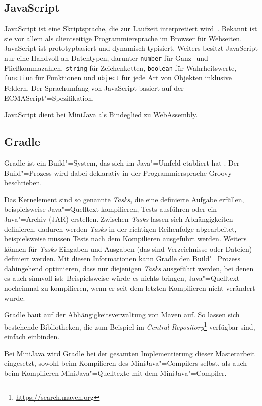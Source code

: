 \subsection{JavaScript}
JavaScript ist eine Skriptsprache, die zur Laufzeit interpretiert wird \cite{MDNJavaScript}. Bekannt ist sie vor allem als clientseitige Programmiersprache im Browser für Webseiten. JavaScript ist prototypbasiert und dynamisch typisiert. Weiters besitzt JavaScript nur eine Handvoll an Datentypen, darunter \lstinline{number} für Ganz- und Fließkommazahlen, \lstinline{string} für Zeichenketten, \lstinline{boolean} für Wahrheitswerte, \lstinline{function} für Funktionen und \lstinline{object} für jede Art von Objekten inklusive Feldern. Der Sprachumfang von JavaScript basiert auf der ECMAScript"=Spezifikation.

JavaScript dient bei MiniJava als Bindeglied zu WebAssembly.

\subsection{Gradle}
Gradle ist ein Build"=System, das sich im Java"=Umfeld etabliert hat \cite{Gradle}. Der Build"=Prozess wird dabei deklarativ in der Programmiersprache Groovy beschrieben.

Das Kernelement sind so genannte \emph{Tasks}, die eine definierte Aufgabe erfüllen, beispielsweise Java"=Quelltext kompilieren, Tests ausführen oder ein Java"=Archiv (JAR) erstellen. Zwischen \emph{Tasks} lassen sich Abhängigkeiten definieren, dadurch werden \emph{Tasks} in der richtigen Reihenfolge abgearbeitet, beispielsweise müssen Tests nach dem Kompilieren ausgeführt werden. Weiters können für \emph{Tasks} Eingaben und Ausgaben (das sind Verzeichnisse oder Dateien) definiert werden. Mit diesen Informationen kann Gradle den Build"=Prozess dahingehend optimieren, dass nur diejenigen \emph{Tasks} ausgeführt werden, bei denen es auch sinnvoll ist: Beispielsweise würde es nichts bringen, Java"=Quelltext nocheinmal zu kompilieren, wenn er seit dem letzten Kompilieren nicht verändert wurde.

Gradle baut auf der Abhängigkeitsverwaltung von Maven auf. So lassen sich bestehende Bibliotheken, die zum Beispiel im \emph{Central Repository}\footnote{\url{https://search.maven.org}} verfügbar sind, einfach einbinden.

Bei MiniJava wird Gradle bei der gesamten Implementierung dieser Masterarbeit eingesetzt, sowohl beim Kompilieren des MiniJava"=Compilers selbst, als auch beim Kompilieren MiniJava"=Quelltexte mit dem MiniJava"=Compiler.

